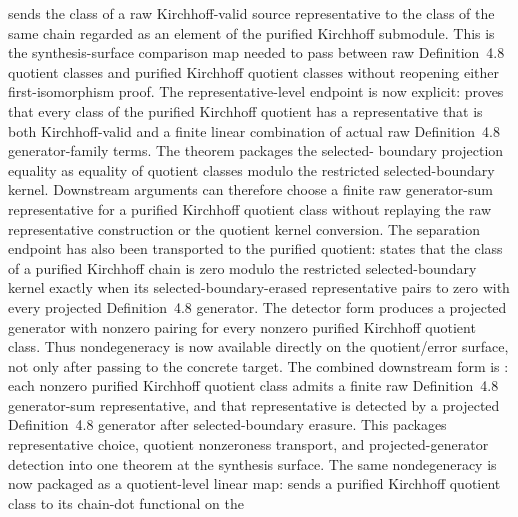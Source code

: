 \documentclass[11pt]{article}
\begin{document}
sends the class of a raw Kirchhoff-valid source representative to the class of
the same chain regarded as an element of the purified Kirchhoff submodule.  This
is the synthesis-surface comparison map needed to pass between raw
Definition~4.8 quotient classes and purified Kirchhoff quotient classes without
reopening either first-isomorphism proof.
The representative-level endpoint is now explicit:
proves that every class of the purified Kirchhoff quotient has a representative
that is both Kirchhoff-valid and a finite linear combination of actual raw
Definition~4.8 generator-family terms.  The theorem packages the selected-
boundary projection equality as equality of quotient classes modulo the
restricted selected-boundary kernel.  Downstream arguments can therefore choose
a finite raw generator-sum representative for a purified Kirchhoff quotient
class without replaying the raw representative construction or the quotient
kernel conversion.
The separation endpoint has also been transported to the purified quotient:
states that the class of a purified Kirchhoff chain is zero modulo the
restricted selected-boundary kernel exactly when its selected-boundary-erased
representative pairs to zero with every projected Definition~4.8 generator.
The detector form
produces a projected generator with nonzero pairing for every nonzero purified
Kirchhoff quotient class.  Thus nondegeneracy is now available directly on the
quotient/error surface, not only after passing to the concrete target.
The combined downstream form is
:
each nonzero purified Kirchhoff quotient class admits a finite raw
Definition~4.8 generator-sum representative, and that representative is
detected by a projected Definition~4.8 generator after selected-boundary
erasure.  This packages representative choice, quotient nonzeroness transport,
and projected-generator detection into one theorem at the synthesis surface.
The same nondegeneracy is now packaged as a quotient-level linear map:
sends a purified Kirchhoff quotient class to its chain-dot functional on the
\end{document}
